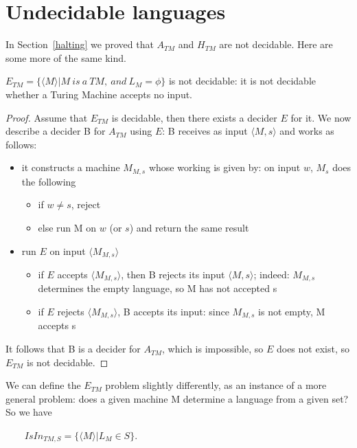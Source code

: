 \section{Undecidable languages}

In Section~\ref{halting} we proved that $A_{TM}$ and $H_{TM}$ are not
decidable. Here are some more of the same kind.

\begin{theorem} \label{nonreductie1}
$E_{TM} = \{\langle M \rangle | M~is~a~TM,~and~L_M = \phi\}$ is not
     decidable: it is not decidable whether a Turing Machine accepts
     no input.
\end{theorem}
\begin{proof}
Assume that $E_{TM}$ is decidable, then there exists a decider $E$ for
it. We now describe a decider B for $A_{TM}$ using $E$:
B receives as input $\langle M,s \rangle$ and works as follows:
\begin{itemize}
\item
it constructs a machine $M_{M,s}$ whose working is given by: on input
$w$, $M_s$ does the following
\begin{itemize}
\item if $w \neq s$, reject
\item else run M on $w$ (or $s$) and return the same result
\end{itemize}

\item
run $E$ on input $\langle M_{M,s} \rangle$
\begin{itemize}
\item if $E$ accepts $\langle M_{M,s} \rangle$, then B rejects its
  input $\langle M,s \rangle$; indeed: $M_{M,s}$ determines the empty
  language, so M has not accepted s
\item if $E$ rejects $\langle M_{M,s} \rangle$, B accepts its input: since  $M_{M,s}$ is not empty, M accepts s
\end{itemize}

\end{itemize}
It follows that B is a decider for $A_{TM}$, which is impossible, so
$E$ does not exist, so $E_{TM}$ is not decidable.
\end{proof}

We can define the $E_{TM}$ problem slightly differently, as an instance
of a more general problem: does a given machine M determine a language
from a given set? So we have

$~~~~~~~~~IsIn_{TM,S} = \{\langle M \rangle| L_M \in S\}$.


